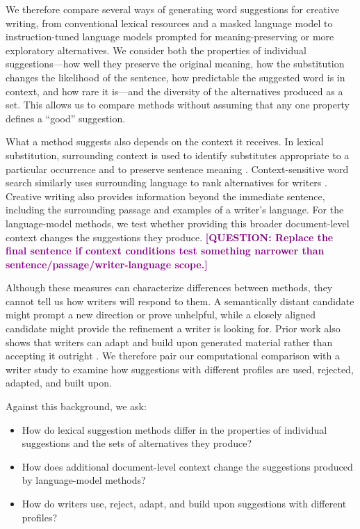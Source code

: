 \documentclass[sigconf,nonacm]{acmart}
\newcommand{\question}[1]{\textcolor{purple}{\textbf{[QUESTION: #1]}}}
\begin{document}
We therefore compare several ways of generating word suggestions for creative writing, from conventional lexical resources and a masked language model to instruction-tuned language models prompted for meaning-preserving or more exploratory alternatives. We consider both the properties of individual suggestions---how well they preserve the original meaning, how the substitution changes the likelihood of the sentence, how predictable the suggested word is in context, and how rare it is---and the diversity of the alternatives produced as a set. This allows us to compare methods without assuming that any one property defines a ``good'' suggestion.

What a method suggests also depends on the context it receives. In lexical substitution, surrounding context is used to identify substitutes appropriate to a particular occurrence and to preserve sentence meaning \cite{zhou2019bert,seneviratne2022cilex}. Context-sensitive word search similarly uses surrounding language to rank alternatives for writers \cite{wiegmann2022language}. Creative writing also provides information beyond the immediate sentence, including the surrounding passage and examples of a writer's language. For the language-model methods, we test whether providing this broader document-level context changes the suggestions they produce.
\question{Replace the final sentence if context conditions test something narrower than sentence/passage/writer-language scope.}

Although these measures can characterize differences between methods, they cannot tell us how writers will respond to them. A semantically distant candidate might prompt a new direction or prove unhelpful, while a closely aligned candidate might provide the refinement a writer is looking for. Prior work also shows that writers can adapt and build upon generated material rather than accepting it outright \cite{singh2022elephant}. We therefore pair our computational comparison with a writer study to examine how suggestions with different profiles are used, rejected, adapted, and built upon.

Against this background, we ask:
\begin{itemize}
    \setlength{\itemsep}{2pt}
    \setlength{\parskip}{0pt}
    \setlength{\parsep}{0pt}
    \setlength{\topsep}{3pt}
    \setlength{\partopsep}{0pt}
    \item[\textbf{RQ1}] How do lexical suggestion methods differ in the
properties of individual suggestions and the sets of alternatives they produce?
    \item[\textbf{RQ2}] How does additional document-level context change the suggestions produced by language-model methods?
    \item[\textbf{RQ3}] How do writers use, reject, adapt, and build upon suggestions with different profiles?
\end{itemize}
\end{document}
